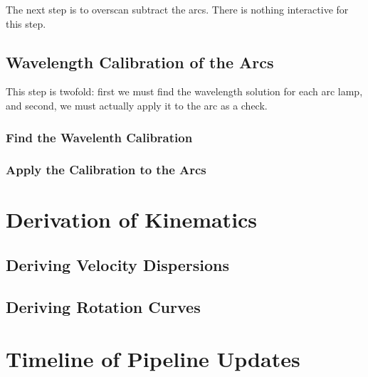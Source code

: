 \documentclass[12pt]{report}
\begin{document}
The next step is to overscan subtract the arcs. There is nothing interactive for this step.

\section{Wavelength Calibration of the Arcs}

This step is twofold: first we must find the wavelength solution for each arc lamp, and second, we must actually apply it to the arc as a check.

\subsection{Find the Wavelenth Calibration}


\subsection{Apply the Calibration to the Arcs}




\chapter{Derivation of Kinematics}

\section{Deriving Velocity Dispersions}
\section{Deriving Rotation Curves}

\chapter{Timeline of Pipeline Updates}


\end{document}
